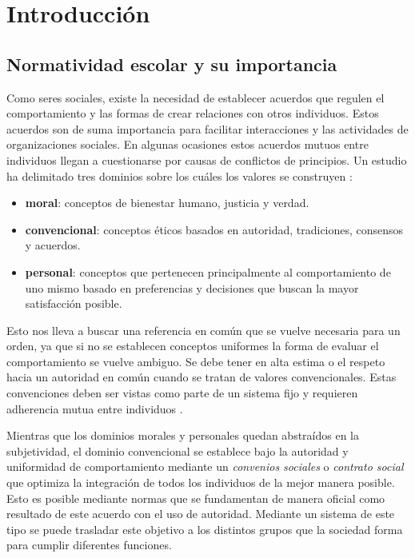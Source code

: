 \chapter{Introducción}


\section{Normatividad escolar y su importancia}

Como seres sociales, existe la necesidad de establecer acuerdos que regulen el comportamiento y las formas de crear relaciones con otros individuos. Estos acuerdos son de suma importancia para facilitar interacciones y las actividades de organizaciones sociales. En algunas ocasiones estos acuerdos mutuos entre individuos llegan a cuestionarse por causas de conflictos de principios. Un estudio ha delimitado tres dominios sobre los cuáles los valores se construyen \parencite{thornberg}:

\begin{itemize}
    \item \textbf{moral}: conceptos de bienestar humano, justicia y verdad.
    \item \textbf{convencional}: conceptos éticos basados en autoridad, tradiciones, consensos y acuerdos.
    \item \textbf{personal}: conceptos que pertenecen principalmente al comportamiento de uno mismo basado en preferencias y decisiones que buscan la mayor satisfacción posible.
\end{itemize}

Esto nos lleva a buscar una referencia en común que se vuelve necesaria para un orden, ya que si no se establecen conceptos uniformes la forma de evaluar el comportamiento se vuelve ambiguo. Se debe tener en alta estima o el respeto hacia un autoridad en común cuando se tratan de valores convencionales. Estas convenciones deben ser vistas como parte de un sistema fijo y requieren adherencia mutua entre individuos \parencite{turiel}.

Mientras que los dominios morales y personales quedan abstraídos en la subjetividad, el dominio convencional se establece bajo la autoridad y uniformidad de comportamiento mediante un \textit{convenios sociales} o \textit{contrato social} que optimiza la integración de todos los individuos de la mejor manera posible. Esto es posible mediante normas que se fundamentan de manera oficial como resultado de este acuerdo con el uso de autoridad. Mediante un sistema de este tipo se puede trasladar este objetivo a los distintos grupos que la sociedad forma para cumplir diferentes funciones.


